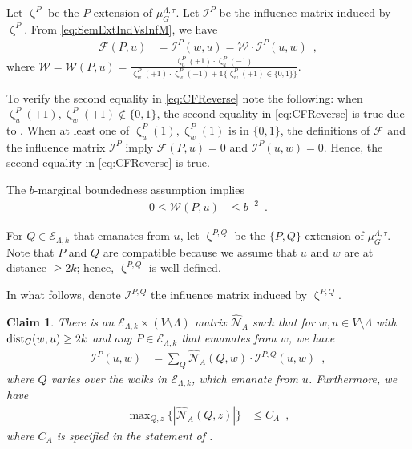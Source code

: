 \documentclass[11pt,reqno]{amsart}
\numberwithin{equation}{section}
\newtheorem{claim}[theorem]{Claim}
\newcommand{\cE}{{\mathcal{E}}}
\newcommand{\cF}{{\mathcal{F}}}
\newcommand{\cI}{{\mathcal{I}}}
\newcommand{\cN}{{\mathcal{N}}}
\newcommand{\cW}{{\mathcal{W}}}
\newcommand{\amethyst}[1]{{\color{amethyst}#1} }
\newcommand{\blue}[1]{{\color{blue}#1}}
\newcommand{\bluepigment}[1]{{\color{blue(pigment)}#1}}
\newcommand{\cadmiumgreen}[1]{{\color{cadmiumgreen}#1}}
\newcommand{\goldenbrown}[1]{{\color{goldenbrown}#1}}
\newcommand{\iris}[1]{{\color{iris}#1}}
\newcommand{\red}[1]{{\color{red}#1}}
\newcommand{\Ind}{\mathds{1}}
\newcommand{\dist}{{\rm dist}}
\newcommand{\ExtV}{\iris{\cE}}
\newcommand{\infmatrix}{\cI}
\renewcommand{\amethyst}[1]{#1}
\renewcommand{\blue}[1]{#1}
\renewcommand{\bluepigment}[1]{#1}
\renewcommand{\cadmiumgreen}[1]{#1}
\renewcommand{\goldenbrown}[1]{#1}
\renewcommand{\iris}[1]{#1}
\renewcommand{\red}[1]{#1}
\newcommand{\kk}{\bluepigment{k}}
\newcommand{\kP}{\goldenbrown{P}}
\newcommand{\kQ}{\amethyst{Q}}
\newcommand{\ku}{\red{u}}
\newcommand{\kw}{\blue{w}}
\newcommand{\kz}{\cadmiumgreen{z}}
\renewcommand{\kk}{k}
\renewcommand{\kP}{P}
\renewcommand{\kQ}{Q}
\renewcommand{\ku}{u}
\renewcommand{\kw}{w}
\renewcommand{\kz}{z}
\newcommand{\SemExtdInfMatrix}{\cF}
\newcommand{\SymWeightM}{\cN}
\begin{document}
Let $\upzeta^{\kP}$ be the $\kP$-extension of $\mu^{\Lambda,\tau}_{G}$. Let $\infmatrix^{\kP}$ 
be the influence matrix induced by $\upzeta^{\kP}$. 
From \eqref{eq:SemExtIndVsInfM}, we have 
\begin{align}\label{eq:CFReverse}
\SemExtdInfMatrix(\kP, \ku) &=\infmatrix^{\kP}(\kw,\ku) =\cW \cdot \infmatrix^{\kP}(\ku,\kw) \enspace, 
\end{align}
where $\cW=\cW(\kP, \ku)=\frac {\upzeta^{\kP}_{\ku}(+1)\cdot \upzeta^{\kP}_{\ku}(-1 )} {\upzeta^{\kP}_{\kw}(+1)\cdot \upzeta^{\kP}_{\kw}(-1)+\Ind\{\upzeta^{\kP}_{\kw}(+1)\in \{0,1\}\}}$.

To verify the second equality in \eqref{eq:CFReverse} note the following:
when $\upzeta^{\kP}_{\ku}(+1), \upzeta^{\kP}_{\kw}(+1)\notin \{0,1\}$, the second equality in \eqref{eq:CFReverse} 
is true due to .
%
When at least one of $\upzeta^{\kP}_{\ku}(1), \upzeta^{\kP}_{\kw}(1)$ is in $\{0,1\}$, 
the definitions of $\SemExtdInfMatrix$ and the influence matrix $\infmatrix^{\kP}$
imply 
$\SemExtdInfMatrix(\kP, \ku)=0$ and $\infmatrix^{\kP}(\ku,\kw)=0$. 
Hence, the second equality in \eqref{eq:CFReverse} is  true.

The $b$-marginal boundedness assumption implies %
\begin{align}\label{eq:Bound4CN1}
0\leq \cW(\kP,\ku) & \leq b^{-2} \enspace. 
\end{align}

\noindent
For $\kQ\in \ExtV_{\Lambda,\kk}$ that emanates from $\ku$, let $\upzeta^{\kP,\kQ}$ be the $\{\kP,\kQ\}$-extension of 
$\mu^{\Lambda,\tau}_{G}$. Note that $\kP$ and $\kQ$ are compatible because we assume that $\ku$ and $\kw$ 
are at distance $\geq 2\kk$; hence, $\upzeta^{\kP,\kQ}$ is well-defined. 

In what follows, denote $\infmatrix^{\kP,\kQ}$ the influence matrix induced by $\upzeta^{\kP,\kQ}$.
%
%
\begin{claim}\label{claim:CFReverseSplit}
There is an $\ExtV_{\Lambda,\kk}\times (V\setminus \Lambda)$ matrix $\widehat{\SymWeightM}_A$ such that 
for $\kw, \ku\in V\setminus \Lambda$ with $\dist_{G}(\kw,\ku)\geq 2\kk$ and any $\kP\in \ExtV_{\Lambda,\kk}$ that emanates from $\kw$, 
%
we have
\begin{align}\label{eq:CFReverseSplit}
\infmatrix^{\kP}(\ku,\kw) &=\sum\nolimits_{\kQ} 
\widehat{\SymWeightM}_A(\kQ, \kw) \cdot \infmatrix^{\kP,\kQ} (\ku,\kw)
\enspace,
\end{align}
where $\kQ$ varies over the walks in $\ExtV_{\Lambda,\kk}$, which emanate from $\ku$. 
%
Furthermore, we have
 \begin{align}\label{eq:CFReverseSplitBB}
\max\nolimits_{\kQ,\kz} \{ |\widehat{\SymWeightM}_A(\kQ,\kz)| \} & \leq C_A\enspace,
\end{align}
 where $C_A$ is specified in 
the statement of .
\end{claim}
\end{document}
